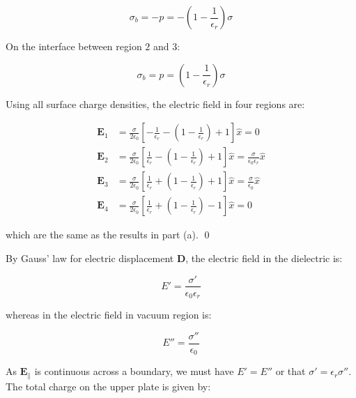 \documentclass[12pt]{article}
\begin{document}
\begin{equation}
    \sigma_{b} = -p = -\left( 1 - \frac{1}{\epsilon_{r}} \right) \sigma
\end{equation}

On the interface between region $2$ and $3$:

\begin{equation}
    \sigma_{b} = p = \left( 1 - \frac{1}{\epsilon_{r}} \right) \sigma
\end{equation}

Using all surface charge densities, the electric field in four regions are:

\begin{equation}
    \begin{split}
        \mathbf{E}_{1} &= \frac{\sigma}{2\epsilon_{0}} \left[ -\frac{1}{\epsilon_{r}} - \left( 1 - \frac{1}{\epsilon_{r}} \right) + 1 \right] \hat{x} = 0 \\
        \mathbf{E}_{2} &= \frac{\sigma}{2\epsilon_{0}} \left[ \frac{1}{\epsilon_{r}} - \left( 1 - \frac{1}{\epsilon_{r}} \right) + 1 \right] \hat{x} = \frac{\sigma}{\epsilon_{0}\epsilon_{r}} \hat{x} \\
        \mathbf{E}_{3} &= \frac{\sigma}{2\epsilon_{0}} \left[ \frac{1}{\epsilon_{r}} + \left( 1 - \frac{1}{\epsilon_{r}} \right) + 1 \right] \hat{x} = \frac{\sigma}{\epsilon_{0}} \hat{x} \\
        \mathbf{E}_{4} &= \frac{\sigma}{2\epsilon_{0}} \left[ \frac{1}{\epsilon_{r}} + \left( 1 - \frac{1}{\epsilon_{r}} \right) - 1 \right] \hat{x} = 0
    \end{split}
\end{equation}

which are the same as the results in part (a).
\qed



By Gauss' law for electric displacement $\mathbf{D}$, the electric field in the dielectric is:

\begin{equation}
    E' = \frac{\sigma'}{\epsilon_{0} \epsilon_{r}}
\end{equation}

whereas in the electric field in vacuum region is:

\begin{equation}
    E'' = \frac{\sigma''}{\epsilon_{0}}
\end{equation}

As $\mathbf{E}_{\parallel}$ is continuous across a boundary, we must have $E' = E''$ or that $\sigma' = \epsilon_{r} \sigma''$. The total charge on the upper plate is given by:
\end{document}
